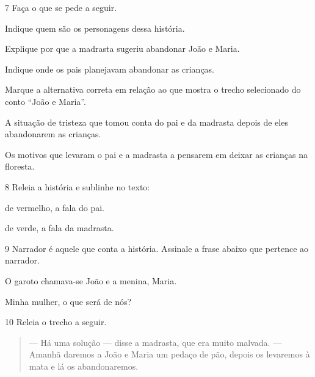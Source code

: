 \num{7} Faça o que se pede a seguir.

\begin{escolha}[itemsep=-5pt]
\item Indique quem são os personagens dessa história.
\item{}

\item Explique por que a madrasta sugeriu abandonar João e Maria.
\item{}

\item Indique onde os pais planejavam abandonar as crianças.
\item{}

\item Marque a alternativa correta em relação ao que mostra o trecho
selecionado do conto ``João e Maria''.

\begin{boxlist}
 A situação de tristeza que tomou conta do pai e da madrasta depois
de eles abandonarem as crianças.

 Os motivos que levaram o pai e a madrasta a pensarem em deixar as
crianças na floresta.
\end{boxlist}
\end{escolha}

\num{8} Releia a história e sublinhe no texto:

\begin{escolha}[itemsep=-5pt]
\item de vermelho, a fala do pai.

\item de verde, a fala da madrasta.
\end{escolha}

\num{9} Narrador é aquele que conta a história. Assinale a frase abaixo que
pertence ao narrador.

\begin{escolha}[itemsep=-5pt]
 O garoto chamava-se João e a menina, Maria.

 Minha mulher, o que será de nós?
\end{escolha}

\num{10} Releia o trecho a seguir.

\begin{quote}
--- Há uma solução --- disse a madrasta, que era muito malvada.
--- Amanhã daremos a João e Maria um pedaço de pão, depois os levaremos
à mata e lá os abandonaremos.
\end{quote}

